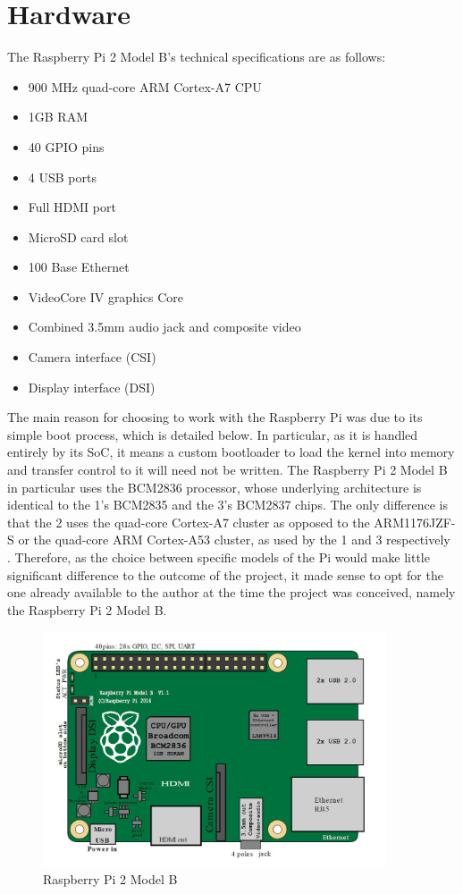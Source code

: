 \documentclass[10pt,a4paper]{article}
\begin{document}
\section*{Hardware}
The Raspberry Pi 2 Model B's technical specifications are as follows:
\begin{itemize}
    \item 900 MHz quad-core ARM Cortex-A7 CPU
    \item 1GB RAM
    \item 40 GPIO pins
    \item 4 USB ports
    \item Full HDMI port
    \item MicroSD card slot
    \item 100 Base Ethernet
    \item VideoCore IV graphics Core
    \item Combined 3.5mm audio jack and composite video
    \item Camera interface (CSI)
    \item Display interface (DSI)
\end{itemize}

The main reason for choosing to work with the Raspberry Pi was due to its simple
boot process, which is detailed below. In particular, as it is handled entirely
by its SoC, it means a custom bootloader to load the kernel into memory and
transfer control to it will need not be written. The Raspberry Pi 2 Model B in
particular uses the BCM2836 processor, whose underlying architecture is
identical to the 1's BCM2835 and the 3's BCM2837 chips. The only difference is
that the 2 uses the quad-core Cortex-A7 cluster as opposed to the ARM1176JZF-S
or the quad-core ARM Cortex-A53 cluster, as used by the 1 and 3 respectively
\cite{BCM2835,BCM2837}.
Therefore, as the choice between specific models of the Pi would make little
significant difference to the outcome of the project, it made sense to opt for
the one already available to the author at the time the project was conceived,
namely the Raspberry Pi 2 Model B.

\begin{figure}[h]
    \begin{center}
        \includegraphics[width=4in]{pi-diag.png}
        \caption{Raspberry Pi 2 Model B}
    \end{center}
\end{figure}
\end{document}
